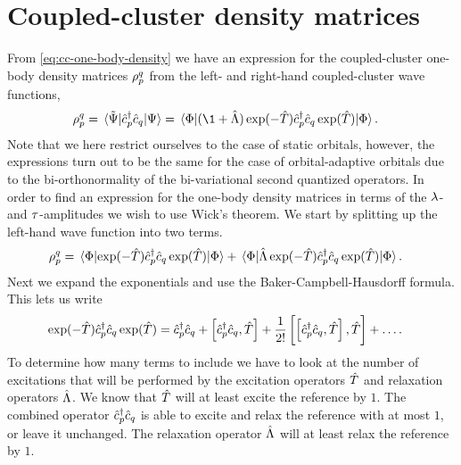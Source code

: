\chapter{Coupled-cluster density matrices}
    \label{app:cc-density-matrices}
    From \autoref{eq:cc-one-body-density} we have an expression for the
    coupled-cluster one-body density matrices $\rho^q_p$ from the left-
    and right-hand coupled-cluster wave functions,
    \begin{align}
        \densityten^{q}_{p}
        &= \mel*{\tilde{\Psi}}{\ccr{p}\can{q}}{\Psi}
        = \mel*{\slat}{
            (\1 + \clustl)
            \exponential(-\clust)
            \ccr{p}\can{q}
            \exponential(\clust)
        }{\slat}.
    \end{align}
    Note that we here restrict ourselves to the case of static orbitals,
    however, the expressions turn out to be the same for the case of
    orbital-adaptive orbitals due to the bi-orthonormality of the bi-variational
    second quantized operators.
    In order to find an expression for the one-body density matrices in terms of
    the $\lambda$- and $\tau$-amplitudes we wish to use Wick's theorem.
    We start by splitting up the left-hand wave function into two terms.
    \begin{align}
        \densityten^q_p
        &= \mel*{\slat}{
            \exponential(-\clust)
            \ccr{p}\can{q}
            \exponential(\clust)
        }{\slat}
        + \mel*{\slat}{
            \clustl
            \exponential(-\clust)
            \ccr{p}\can{q}
            \exponential(\clust)
        }{\slat}.
    \end{align}
    Next we expand the exponentials and use the Baker-Campbell-Hausdorff
    formula.
    This lets us write
    \begin{align}
        \exponential(-\clust)
        \ccr{p}\can{q}
        \exponential(\clust)
        &= \ccr{p}\can{q}
        + \com{\ccr{p}\can{q}}{\clust}
        + \frac{1}{2!}\com{\com{\ccr{p}\can{q}}{\clust}}{\clust}
        + \dots.
    \end{align}
    To determine how many terms to include we have to look at the number of
    excitations that will be performed by the excitation operators $\hat{T}$ and
    relaxation operators $\hat{\Lambda}$.
    We know that $\hat{T}$ will at least excite the reference by $1$.
    The combined operator $\hat{c}_{p}^{\dagger}\hat{c}_{q}$ is able to excite and relax the
    reference with at most $1$, or leave it unchanged.
    The relaxation operator $\hat{\Lambda}$ will at least relax the reference by $1$.
